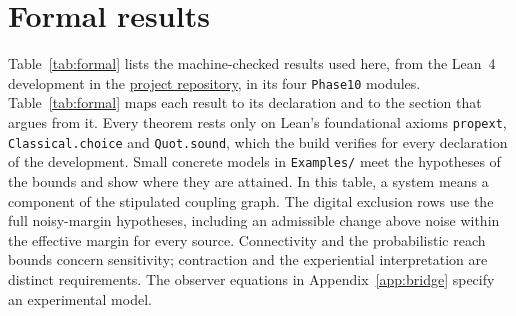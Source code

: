\documentclass[12pt]{article}
\begin{document}
\section{Formal results}
\label{app:formal}

Table~\ref{tab:formal} lists the machine-checked results used here, from the
Lean~4 development in
the \href{https://github.com/bobaseb/coupling_gated_cortical_coherence}{project repository},
in its four \texttt{Phase10} modules. Table~\ref{tab:formal} maps each result to its
declaration and to the section that argues from it. Every theorem rests only on
Lean's foundational axioms \texttt{propext}, \texttt{Classical.\allowbreak{}choice} and
\texttt{Quot.sound}, which the build verifies for every declaration of the
development. Small concrete models in \texttt{Examples/} meet the hypotheses
of the bounds and show where they are attained. In this table, a system
means a component of the stipulated coupling graph. The digital exclusion rows
use the full noisy-margin hypotheses, including an admissible change above
noise within the effective margin for every source. Connectivity and the
probabilistic reach bounds concern sensitivity; contraction and the experiential
interpretation are distinct requirements. The observer equations in
Appendix~\ref{app:bridge} specify an experimental model.
\end{document}
